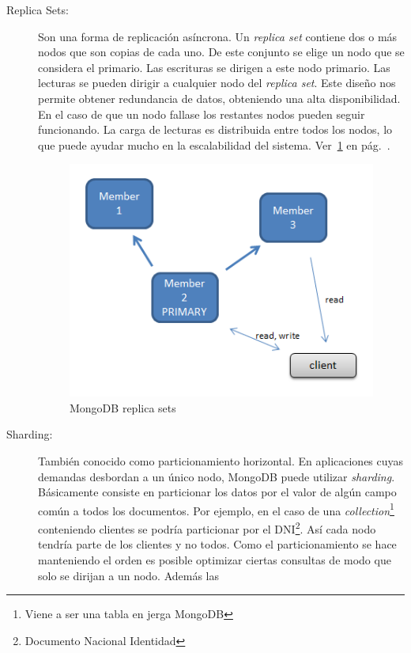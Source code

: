 \begin{description}
\item[Replica Sets:] Son una forma de replicación asíncrona. Un
  \emph{replica set} contiene dos o más nodos que son copias de cada
  uno. De este conjunto se elige un nodo que se considera el
  primario. Las escrituras se dirigen a este nodo primario. Las
  lecturas se pueden dirigir a cualquier nodo del \emph{replica
    set}. Este diseño nos permite obtener redundancia de datos,
  obteniendo una alta disponibilidad. En el caso de que un nodo
  fallase los restantes nodos pueden seguir funcionando. La carga de
  lecturas es distribuida entre todos los nodos, lo que puede ayudar
  mucho en la escalabilidad del sistema. Ver~\ref{replica-sets}
  en pág.~\pageref{replica-sets}.
  \begin{figure}[hbp]
    \begin{center}
      \includegraphics[]{chapters/technical-manual/replset.png}
    \end{center}
  \caption{MongoDB replica sets}\label{replica-sets}
  \end{figure}
\item[Sharding:] También conocido como particionamiento horizontal. En
  aplicaciones cuyas demandas desbordan a un único nodo, MongoDB puede
  utilizar \emph{sharding}. Básicamente consiste en particionar los
  datos por el valor de algún campo común a todos los documentos. Por
  ejemplo, en el caso de una \emph{collection}\footnote{Viene a ser
    una tabla en jerga MongoDB} conteniendo clientes se podría
  particionar por el DNI\footnote{Documento Nacional Identidad}. Así
  cada nodo tendría parte de los clientes y no todos. Como el
  particionamiento se hace manteniendo el orden es posible optimizar
  ciertas consultas de modo que solo se dirijan a un nodo. Además las

\end{description}
